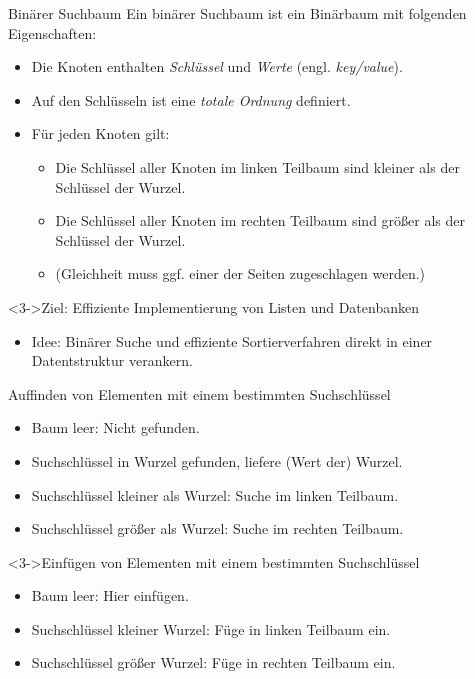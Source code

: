 \begin{frame}
    \begin{defblock}{Binärer Suchbaum}
        Ein binärer Suchbaum ist ein Binärbaum mit folgenden Eigenschaften:
        \begin{itemize}
            \item Die Knoten enthalten \emph{Schlüssel} und \emph{Werte} (engl. \emph{key/value}).
            \item Auf den Schlüsseln ist eine \emph{totale Ordnung} definiert.
            \item<2-> Für jeden Knoten gilt:
            \begin{itemize}
                \item Die Schlüssel aller Knoten im linken Teilbaum sind kleiner als der Schlüssel der Wurzel.
                \item Die Schlüssel aller Knoten im rechten Teilbaum sind größer als der Schlüssel der Wurzel.
                \item (Gleichheit muss ggf. einer der Seiten zugeschlagen werden.)
            \end{itemize}
        \end{itemize}
    \end{defblock}
    \begin{block}<3->{Ziel: Effiziente Implementierung von Listen und Datenbanken}
        \begin{itemize}
            \item Idee: Binärer Suche und effiziente Sortierverfahren
                        direkt in einer Datentstruktur verankern.
        \end{itemize}
    \end{block}
\end{frame}

\begin{frame}
    \begin{block}{Auffinden von Elementen mit einem bestimmten Suchschlüssel}
        \begin{itemize}
            \item<2-> Baum leer: Nicht gefunden.
            \item Suchschlüssel in Wurzel gefunden, liefere (Wert der) Wurzel.
            \item Suchschlüssel kleiner als Wurzel: Suche im linken Teilbaum.
            \item Suchschlüssel größer als Wurzel: Suche im rechten Teilbaum.
        \end{itemize}
    \end{block}
    \begin{block}<3->{Einfügen von Elementen mit einem bestimmten Suchschlüssel}
        \begin{itemize}
            \item<4-> Baum leer: Hier einfügen.
            \item Suchschlüssel kleiner Wurzel: Füge in linken Teilbaum ein.
            \item Suchschlüssel größer Wurzel: Füge in rechten Teilbaum ein.
        \end{itemize}
    \end{block}
\end{frame}

